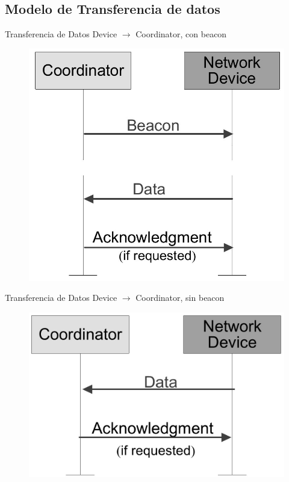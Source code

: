 \documentclass[aspectratio=169]{beamer}
\begin{document}
\subsection[Transferencia de datos]{Modelo de Transferencia de datos}

\begin{frame}[t]{Transferencia de Datos}
\vspace{0px}
Device $\rightarrow$ Coordinator, con beacon
\vspace{10px}
	\begin{figure}[H]
		\includegraphics[height=.7\textheight]{./imagenes/dev-coord-beacon.jpg}
	\end{figure}	 
\end{frame}

\begin{frame}[t]{Transferencia de Datos}
\vspace{0px}
Device $\rightarrow$ Coordinator, sin beacon
\vspace{10px}
	\begin{figure}[H]
		\includegraphics[scale=.21]{./imagenes/dev-coord-sinbeacon.jpg}
	\end{figure}	  	  	
\end{frame}
\end{document}
